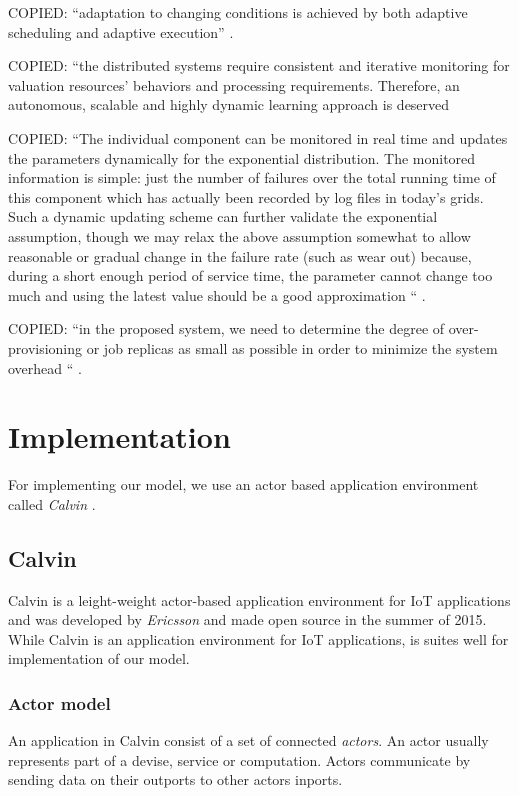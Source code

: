 \documentclass{cslthse-msc}
\begin{document}
COPIED: “adaptation to changing conditions is achieved by both adaptive scheduling and adaptive execution” \cite{evalOfGridRel}.

COPIED:
“the distributed systems require consistent and iterative monitoring for valuation resources’ behaviors and processing requirements. Therefore, an autonomous, scalable and highly dynamic learning approach is deserved \cite{imprRelAdaptRL}


COPIED:
“The individual component can be monitored in real time and updates the parameters dynamically for the exponential distribution. The monitored information is simple: just the number of failures over the total running time of this component which has actually been recorded by log files in today’s grids. Such a dynamic updating scheme can further validate the exponential assumption, though we may relax the above assumption somewhat to allow reasonable or gradual change in the failure rate (such as wear out) because, during a short enough period of service time, the parameter cannot change too much and using the latest value should be a good approximation “ \cite{hierarchicalRelModeling}.

COPIED: “in the proposed system, we need to determine the degree of over-provisioning or job replicas as small as possible in order to minimize the system overhead “ \cite{designFaultTolerantSched}.

\section{Implementation} \label{sec:implementation}
For implementing our model, we use an actor based application environment called \emph{Calvin} \cite{calvin}.

\subsection{Calvin} Calvin is a leight-weight actor-based application environment for IoT applications and was developed by \emph{Ericsson} and made open source in the summer of 2015. While Calvin is an application environment for IoT applications, is suites well for implementation of our model.

\subsubsection{Actor model}
An application in Calvin consist of a set of connected \emph{actors}. An actor usually represents part of a devise, service or computation. Actors communicate by sending data on their outports to other actors inports.  %
\end{document}
